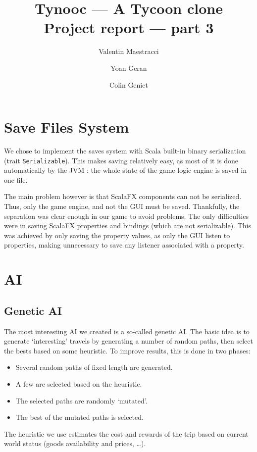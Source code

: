 \documentclass{article}
\begin{document}
\title{Tynooc --- A Tycoon clone \\ \large{Project report --- part 3}}
\author{Valentin Maestracci \and Yoan Geran \and Colin Geniet}
\maketitle
\tableofcontents

\section{Save Files System}
We chose to implement the saves system with Scala built-in binary serialization
(trait \verb|Serializable|). This makes saving relatively easy, as most of it
is done automatically by the JVM : the whole state of the game logic engine is
saved in one file.

The main problem however is that ScalaFX components can not be serialized.
Thus, only the game engine, and not the GUI must be saved.
Thankfully, the separation was clear enough in our game to avoid problems.
The only difficulties were in saving ScalaFX properties and bindings
(which are not serializable). This was achieved by only saving the property
values, as only the GUI listen to properties, making unnecessary to save any
listener associated with a property.

\section{AI}
\subsection{Genetic AI}
The most interesting AI we created is a so-called genetic AI.
The basic idea is to generate `interesting' travels by generating a number
of random paths, then select the bests based on some heuristic.
To improve results, this is done in two phases:
\begin{itemize}
  \item Several random paths of fixed length are generated.
  \item A few are selected based on the heuristic.
  \item The selected paths are randomly `mutated'.
  \item The best of the mutated paths is selected.
\end{itemize}

The heuristic we use estimates the cost and rewards of the trip based on current
world status (goods availability and prices, \dots).
\end{document}
